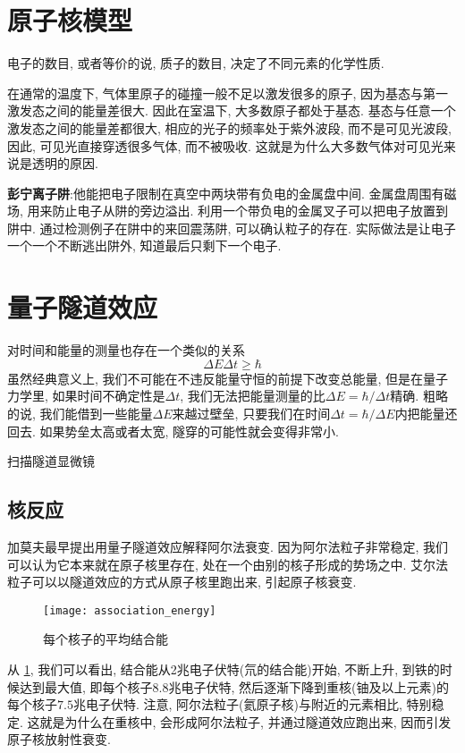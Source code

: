 \section{原子核模型}
电子的数目, 或者等价的说, 质子的数目, 决定了不同元素的化学性质.\par
在通常的温度下, 气体里原子的碰撞一般不足以激发很多的原子, 因为基态与第一激发态之间的能量差很大. 因此在室温下, 大多数原子都处于基态. 基态与任意一个激发态之间的能量差都很大, 相应的光子的频率处于紫外波段, 而不是可见光波段, 因此, 可见光直接穿透很多气体, 而不被吸收. 这就是为什么大多数气体对可见光来说是透明的原因.\par
\textbf{彭宁离子阱}:他能把电子限制在真空中两块带有负电的金属盘中间. 金属盘周围有磁场, 用来防止电子从阱的旁边溢出. 利用一个带负电的金属叉子可以把电子放置到阱中.
通过检测例子在阱中的来回震荡阱, 可以确认粒子的存在. 实际做法是让电子一个一个不断逃出阱外, 知道最后只剩下一个电子.

\section{量子隧道效应}
对时间和能量的测量也存在一个类似的关系
$$
\Delta E \Delta t \geq \hbar
$$
虽然经典意义上, 我们不可能在不违反能量守恒的前提下改变总能量, 但是在量子力学里, 如果时间不确定性是$\Delta t$, 我们无法把能量测量的比$\Delta E = \hbar /\Delta t$精确.
粗略的说, 我们能借到一些能量$\Delta E$来越过壁垒, 只要我们在时间$\Delta t = \hbar / \Delta E$内把能量还回去. 如果势垒太高或者太宽, 隧穿的可能性就会变得非常小.

扫描隧道显微镜

\subsection{核反应}
加莫夫最早提出用量子隧道效应解释阿尔法衰变. 因为阿尔法粒子非常稳定, 我们可以认为它本来就在原子核里存在, 处在一个由别的核子形成的势场之中.
艾尔法粒子可以以隧道效应的方式从原子核里跑出来, 引起原子核衰变.

\begin{figure}[htbp]
		\centering
		\texttt{[image: association\_energy]}
		\caption{每个核子的平均结合能}
		\label{fig.nuclear.association}
\end{figure}
从
\ref{fig.nuclear.association},
我们可以看出, 结合能从2兆电子伏特(氘的结合能)开始, 不断上升, 到铁的时候达到最大值, 即每个核子$8.8$兆电子伏特,
然后逐渐下降到重核(铀及以上元素)的每个核子$7.5$兆电子伏特.
注意, 阿尔法粒子(氦原子核)与附近的元素相比, 特别稳定. 这就是为什么在重核中, 会形成阿尔法粒子, 并通过隧道效应跑出来, 因而引发原子核放射性衰变.

